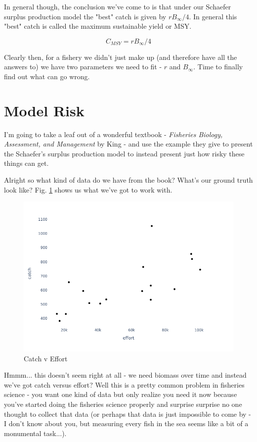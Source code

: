 \documentclass[11pt,a5paper]{book}
\begin{document}
In general though, the conclusion we've come to is that under our Schaefer surplus production model the "best" catch is given by $rB_\infty / 4$. In general this "best" catch is called the maximum sustainable yield or MSY. 

$$C_{MSY} = rB_\infty /4$$

Clearly then, for a fishery we didn't just make up (and therefore have all the answers to) we have two parameters we need to fit - $r$ and $B_\infty$. Time to finally find out what can go wrong.

\section{Model Risk}

I'm going to take a leaf out of a wonderful textbook - \textit{Fisheries Biology, Assessment, and Management} by King - and use the example they give to present the Schaefer's surplus production model to instead present just how risky these things can get. 
\newline

Alright so what kind of data do we have from the book? What's our ground truth look like? Fig. \ref{fig:catch_v_effort} shows us what we've got to work with. 
\newline

\begin{figure}[h!] 
  \includegraphics[width=\linewidth]{notebooks/SurplusModels/measurements.png}
  \caption{Catch v Effort}
  \label{fig:catch_v_effort}
\end{figure}

Hmmm... this doesn't seem right at all - we need biomass over time and instead we've got catch versus effort? Well this is a pretty common problem in fisheries science - you want one kind of data but only realize you need it now because you've started doing the fisheries science properly and surprise surprise no one thought to collect that data (or perhaps that data is just impossible to come by - I don't know about you, but measuring every fish in the sea seems like a bit of a monumental task...). 
\newline
\end{document}
